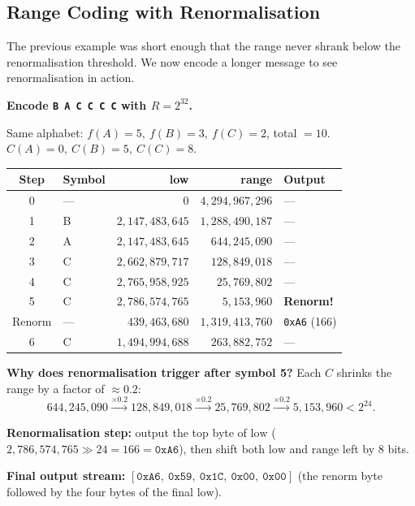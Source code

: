 \subsection{Range Coding with Renormalisation}

The previous example was short enough that the range never shrank below the
renormalisation threshold. We now encode a longer message to see renormalisation
in action.

\begin{examplebox}
\textbf{Encode \texttt{B A C C C C} with $R = 2^{32}$.}

Same alphabet: $f(A)=5,\ f(B)=3,\ f(C)=2$, total $=10$.
$C(A)=0,\ C(B)=5,\ C(C)=8$.

\medskip
\begin{center}
\begin{tabular}{@{}clrrl@{}}
\toprule
\textbf{Step} & \textbf{Symbol} & \textbf{low} & \textbf{range} & \textbf{Output} \\
\midrule
0 & — & $0$ & $4{,}294{,}967{,}296$ & — \\
1 & B & $2{,}147{,}483{,}645$ & $1{,}288{,}490{,}187$ & — \\
2 & A & $2{,}147{,}483{,}645$ & $644{,}245{,}090$ & — \\
3 & C & $2{,}662{,}879{,}717$ & $128{,}849{,}018$ & — \\
4 & C & $2{,}765{,}958{,}925$ & $25{,}769{,}802$ & — \\
5 & C & $2{,}786{,}574{,}765$ & $5{,}153{,}960$ & \textbf{Renorm!} \\
Renorm & — & $439{,}463{,}680$ & $1{,}319{,}413{,}760$ & \texttt{0xA6} (166) \\
6 & C & $1{,}494{,}994{,}688$ & $263{,}882{,}752$ & — \\
\bottomrule
\end{tabular}
\end{center}

\medskip
\textbf{Why does renormalisation trigger after symbol 5?}
Each $C$ shrinks the range by a factor of $\approx 0.2$:
\[
  644{,}245{,}090 \xrightarrow{\times 0.2} 128{,}849{,}018
  \xrightarrow{\times 0.2} 25{,}769{,}802
  \xrightarrow{\times 0.2} 5{,}153{,}960 < 2^{24}.
\]

\textbf{Renormalisation step:} output the top byte of $\mathrm{low}$
($2{,}786{,}574{,}765 \gg 24 = 166 = \texttt{0xA6}$), then shift both
$\mathrm{low}$ and $\mathrm{range}$ left by 8 bits.

\medskip
\textbf{Final output stream:}
$[\texttt{0xA6},\ \texttt{0x59},\ \texttt{0x1C},\ \texttt{0x00},\ \texttt{0x00}]$
(the renorm byte followed by the four bytes of the final $\mathrm{low}$).
\end{examplebox}

